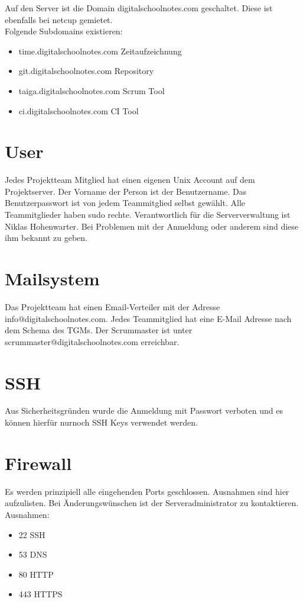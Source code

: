 \documentclass[12pt,a4paper,oneside,ngerman]{scrartcl}
\begin{document}
Auf den Server ist die Domain digitalschoolnotes.com geschaltet. Diese ist ebenfalls bei netcup gemietet.\\

Folgende Subdomains existieren:

\begin{itemize}
\item time.digitalschoolnotes.com \hfill Zeitaufzeichnung
\item git.digitalschoolnotes.com \hfill Repository
\item taiga.digitalschoolnotes.com \hfill Scrum Tool
\item ci.digitalschoolnotes.com \hfill CI Tool
\end{itemize}

\section{User}
Jedes Projektteam Mitglied hat einen eigenen Unix Account auf dem Projektserver. Der Vorname der Person ist der Benutzername. Das Benutzerpasswort ist von jedem Teammitglied selbst gewählt. Alle Teammitglieder haben sudo rechte. Verantwortlich für die Serververwaltung ist Niklas Hohenwarter. Bei Problemen mit der Anmeldung oder anderem sind diese ihm bekannt zu geben.

\section{Mailsystem}
Das Projektteam hat einen Email-Verteiler mit der Adresse info@digitalschoolnotes.com. Jedes Teammitglied hat eine E-Mail Adresse nach dem Schema des TGMs. Der Scrummaster ist unter scrummaster@digitalschoolnotes.com erreichbar.

\section{SSH}
Aus Sicherheitsgründen wurde die Anmeldung mit Passwort verboten und es können hierfür nurnoch SSH Keys verwendet werden.
\newpage

\section{Firewall}
Es werden prinzipiell alle eingehenden Ports geschlossen. Ausnahmen sind hier aufzulisten. Bei Änderungswünschen ist der Serveradministrator zu kontaktieren.\\

Ausnahmen:
\begin{itemize}
\item 22	SSH
\item 53	DNS
\item 80	HTTP
\item 443	HTTPS
\end{itemize}
\end{document}
